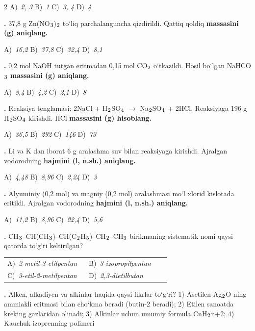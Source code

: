 \documentclass[11pt,a4paper]{article}
\renewcommand{\textsubscript}[1]{\ensuremath{_{\text{\fontsize{8}{8}\selectfont #1}}}}
\newcommand{\qn}[1]{\textbf{\fontsize{11.5}{13}\selectfont #1}}
\newcommand{\qsep}{\par\vspace{1pt}\noindent\rule{0pt}{0.4pt}\par\vspace{5pt}}
\begin{document}
\begin{multicols}{2}
\noindent A)~\textsl{2, 3} \hfill B)~\textsl{1} \hfill C)~\textsl{3, 4} \hfill D)~\textsl{4}\par
\qsep
\noindent\qn{15.} 37,8 g Zn(NO\textsubscript{3})\textsubscript{2} to`liq parchalanguncha qizdirildi. Qattiq qoldiq \textbf{massasini (g) aniqlang.}

\noindent A)~\textsl{16,2} \hfill B)~\textsl{37,8} \hfill C)~\textsl{32,4} \hfill D)~\textsl{8,1}\par
\qsep
\noindent\qn{16.} 0,2 mol NaOH tutgan eritmadan 0,15 mol CO\textsubscript{2} o`tkazildi. Hosil bo`lgan NaHCO\textsubscript{3} \textbf{massasini (g) aniqlang.}

\noindent A)~\textsl{8,4} \hfill B)~\textsl{4,2} \hfill C)~\textsl{2,1} \hfill D)~\textsl{8}\par
\qsep
\noindent\qn{17.} Reaksiya tenglamasi: 2NaCl + H\textsubscript{2}SO\textsubscript{4} $\to$ Na\textsubscript{2}SO\textsubscript{4} + 2HCl. Reaksiyaga 196 g H\textsubscript{2}SO\textsubscript{4} kirishdi. HCl \textbf{massasini (g) hisoblang.}

\noindent A)~\textsl{36,5} \hfill B)~\textsl{292} \hfill C)~\textsl{146} \hfill D)~\textsl{73}\par
\qsep
\noindent\qn{18.} Li va K dan iborat 6 g aralashma suv bilan reaksiyaga kirishdi. Ajralgan vodorodning \textbf{hajmini (l, n.sh.) aniqlang.}

\noindent A)~\textsl{4,48} \hfill B)~\textsl{8,96} \hfill C)~\textsl{2,24} \hfill D)~\textsl{3}\par
\qsep
\noindent\qn{19.} Alyuminiy (0,2 mol) va magniy (0,2 mol) aralashmasi mo`l xlorid kislotada eritildi. Ajralgan vodorodning \textbf{hajmini (l, n.sh.) aniqlang.}

\noindent A)~\textsl{11,2} \hfill B)~\textsl{8,96} \hfill C)~\textsl{22,4} \hfill D)~\textsl{5,6}\par
\qsep
\noindent\qn{20.} CH\textsubscript{3}--CH(CH\textsubscript{3})--CH(C\textsubscript{2}H\textsubscript{5})--CH\textsubscript{2}--CH\textsubscript{3} birikmaning sistematik nomi qaysi qatorda to`g`ri keltirilgan?

\noindent\begin{tabular}{@{}p{0.47\linewidth}@{}p{0.47\linewidth}@{}}
A)~\textsl{2-metil-3-etilpentan} & B)~\textsl{3-izopropilpentan} \\
C)~\textsl{3-etil-2-metilpentan} & D)~\textsl{2,3-dietilbutan} \\
\end{tabular}\par
\qsep
\noindent\qn{21.} Alken, alkadiyen va alkinlar haqida qaysi fikrlar to`g`ri? 1) Asetilen Ag\textsubscript{2}O ning ammiakli eritmasi bilan cho`kma beradi (butin-2 beradi); 2) Etilen sanoatda kreking gazlaridan olinadi; 3) Alkinlar uchun umumiy formula CnH\textsubscript{2}n+2; 4) Kauchuk izoprenning polimeri


\end{multicols}
\end{document}
